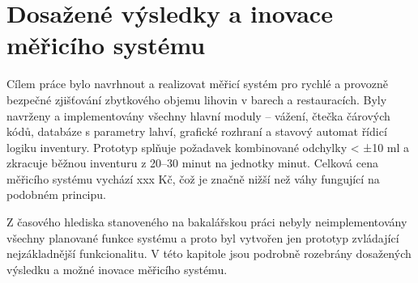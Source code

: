 


%
%

\chapter{Dosažené výsledky a inovace měřicího systému}

 Cílem práce bylo navrhnout a realizovat měřicí systém pro rychlé a provozně bezpečné zjišťování zbytkového objemu lihovin v barech a restauracích. Byly navrženy a implementovány všechny hlavní moduly – vážení, čtečka čárových kódů, databáze s parametry lahví, grafické rozhraní a stavový automat řídicí logiku inventury.  Prototyp splňuje požadavek kombinované odchylky < ±10 ml a zkracuje běžnou inventuru z 20–30 minut na jednotky minut. Celková cena měřicího systému vychází xxx Kč, čož je značně nižší než váhy fungující na podobném principu.

Z časového hlediska stanoveného na bakalářskou práci nebyly neimplementovány všechny planované funkce systému a proto byl vytvořen jen prototyp zvládající nejzákladnější funkcionalitu. V této kapitole jsou podrobně rozebrány dosažených výsledku a možné inovace měřicího systému.

%
%
